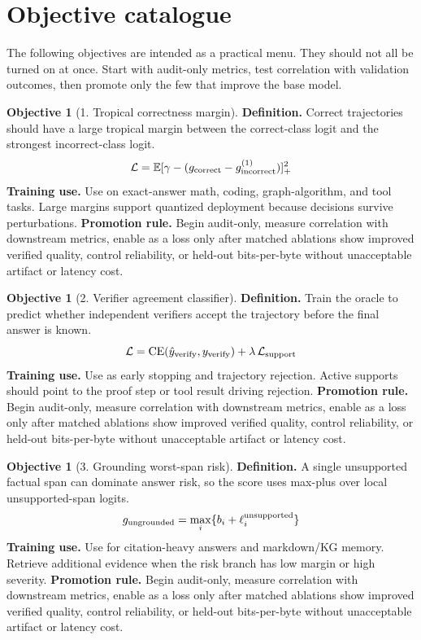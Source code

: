 \documentclass[11pt]{article}
\theoremstyle{definition}
\newtheorem{objective}[theorem]{Objective}
\theoremstyle{remark}
\newcommand{\CE}{\operatorname{CE}}
\newcommand{\E}{\mathbb{E}}
\newcommand{\loss}{\mathcal{L}}
\numberwithin{equation}{section}
\begin{document}
\section{Objective catalogue}

The following objectives are intended as a practical menu.  They should not all be turned on at once.  Start with audit-only metrics, test correlation with validation outcomes, then promote only the few that improve the base model.


\begin{objective}[1. Tropical correctness margin]
\textbf{Definition.} Correct trajectories should have a large tropical margin between the correct-class logit and the strongest incorrect-class logit.
\begin{equation}
    \loss=\E[\gamma-(g_{\rm correct}-g_{\rm incorrect}^{(1)})]_+^2
\end{equation}
\textbf{Training use.} Use on exact-answer math, coding, graph-algorithm, and tool tasks. Large margins support quantized deployment because decisions survive perturbations.
\textbf{Promotion rule.} Begin audit-only, measure correlation with downstream metrics, enable as a loss only after matched ablations show improved verified quality, control reliability, or held-out bits-per-byte without unacceptable artifact or latency cost.
\end{objective}


\begin{objective}[2. Verifier agreement classifier]
\textbf{Definition.} Train the oracle to predict whether independent verifiers accept the trajectory before the final answer is known.
\begin{equation}
    \loss=\CE(\hat y_{\rm verify}, y_{\rm verify})+\lambda\,\loss_{\rm support}
\end{equation}
\textbf{Training use.} Use as early stopping and trajectory rejection. Active supports should point to the proof step or tool result driving rejection.
\textbf{Promotion rule.} Begin audit-only, measure correlation with downstream metrics, enable as a loss only after matched ablations show improved verified quality, control reliability, or held-out bits-per-byte without unacceptable artifact or latency cost.
\end{objective}


\begin{objective}[3. Grounding worst-span risk]
\textbf{Definition.} A single unsupported factual span can dominate answer risk, so the score uses max-plus over local unsupported-span logits.
\begin{equation}
    g_{\rm ungrounded}=\max_i\{b_i+\ell_i^{\rm unsupported}\}
\end{equation}
\textbf{Training use.} Use for citation-heavy answers and markdown/KG memory. Retrieve additional evidence when the risk branch has low margin or high severity.
\textbf{Promotion rule.} Begin audit-only, measure correlation with downstream metrics, enable as a loss only after matched ablations show improved verified quality, control reliability, or held-out bits-per-byte without unacceptable artifact or latency cost.
\end{objective}
\end{document}
